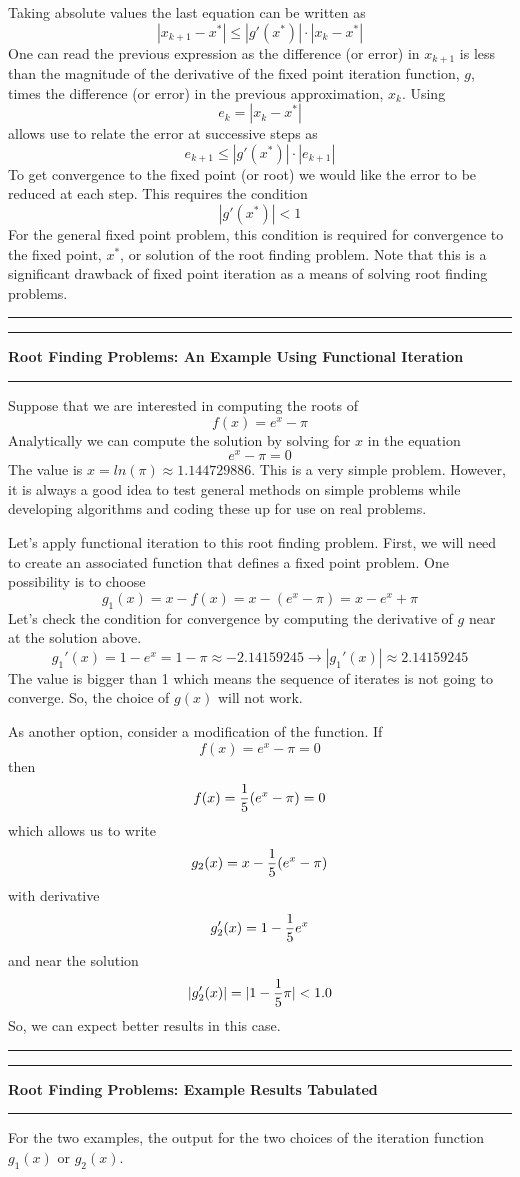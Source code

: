 \documentclass[10pt,fleqn]{article}
\begin{document}
Taking absolute values the last equation can be written as
$$
  | x_{k+1} - x^* | \leq | g'(x^*) | \cdot | x_k - x^* |
$$
One can read the previous expression as the difference (or error) in $x_{k+1}$
is less than the magnitude of the derivative of the fixed point iteration 
function, $g$, times the difference (or error) in the previous approximation,
$x_k$. Using
$$
  e_{k} = | x_k - x^* |
$$
allows use to relate the error at successive steps as
$$
  e_{k+1} \leq | g'(x^*) | \cdot | e_{k+1} |
$$
To get convergence to the fixed point (or root) we would like the error to be
reduced at each step. This requires the condition
$$
  | g'(x^*) | < 1
$$
For the general fixed point problem, this condition is required for convergence
to the fixed point, $x^*$, or solution of the root finding problem. Note that
this is a significant drawback of fixed point iteration as a means of solving
root finding problems.
\vskip0.1in\hrule\vskip0.1in
\newpage
\vskip0.1in\hrule\vskip0.1in
\noindent
{\bf Root Finding Problems: An Example Using Functional Iteration} 
\vskip0.1in\hrule\vskip0.1in
\noindent
Suppose that we are interested in computing the roots of
$$
  f(x) = e^x - \pi
$$
Analytically we can compute the solution by solving for $x$ in the equation
$$
  e^x - \pi = 0
$$
The value is $x=ln(\pi)\approx 1.144729886$. This is a very simple problem.
However, it is always a good idea to test general methods on simple problems
while developing algorithms and coding these up for use on real problems.

Let's apply functional iteration to this root finding problem. First, we will
need to create an associated function that defines a fixed point problem. One
possibility is to choose
$$
  g_1(x) = x - f(x) = x - ( e^x - \pi ) = x - e^x + \pi
$$
Let's check the condition for convergence by computing the derivative of $g$
near at the solution above.
$$
  g_1'(x) = 1 - e^x = 1 - \pi \approx -2.14159245 \rightarrow 
  | g_1'(x) | \approx 2.14159245
$$
The value is bigger than 1 which means the sequence of iterates is not going to
converge. So, the choice of $g(x)$ will not work.

As another option, consider a modification of the function. If
$$
  f(x) = e^x - \pi = 0
$$
then
$$
  f(x) = {1\over 5} ( e^x - \pi ) = 0
$$
which allows us to write
$$
  g_2(x) = x - {1\over 5} ( e^x - \pi )
$$
with derivative
$$
  g_2'(x) = 1 - {1\over 5} e^x 
$$
and near the solution
$$
  |g_2'(x)| = | 1 - {1\over 5} \pi | < 1.0
$$
So, we can expect better results in this case.
\vskip0.1in\hrule\vskip0.1in
\newpage
\vskip0.1in\hrule\vskip0.1in
\noindent
{\bf Root Finding Problems: Example Results Tabulated} 
\vskip0.1in\hrule\vskip0.1in
\noindent
For the two examples, the output for the two choices of the iteration function
$g_1(x)$ or $g_2(x)$.
\end{document}
